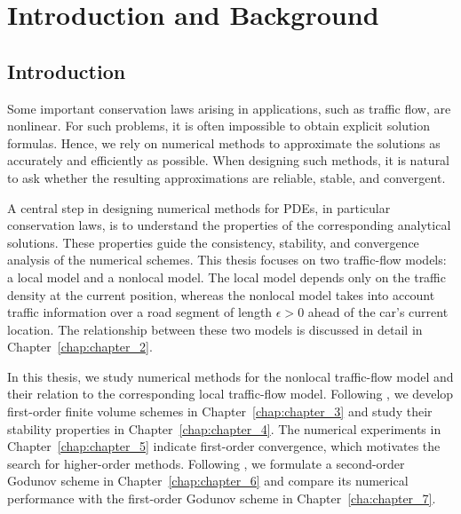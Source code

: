 \part{Introduction and Background}
\chapter{Introduction}\label{chap:chapter_1}
Some important conservation laws arising in applications, such as traffic flow, are nonlinear. For such problems, it is often impossible to obtain explicit solution formulas. Hence, we rely on numerical methods to approximate the solutions as accurately and efficiently as possible. When designing such methods, it is natural to ask whether the resulting approximations are reliable, stable, and convergent.

A central step in designing numerical methods for PDEs, in particular conservation laws, is to understand the properties of the corresponding analytical solutions. These properties guide the consistency, stability, and convergence analysis of the numerical schemes. This thesis focuses on two traffic-flow models: a local model and a nonlocal model. The local model depends only on the traffic density at the current position, whereas the nonlocal model takes into account traffic information over a road segment of length \(\epsilon>0\) ahead of the car's current location. The relationship between these two models is discussed in detail in Chapter~\ref{chap:chapter_2}.

In this thesis, we study numerical methods for the nonlocal traffic-flow model and their relation to the corresponding local traffic-flow model. Following \cite{huangAsymptoticCompatibilityClass2024}, we develop first-order finite volume schemes in Chapter~\ref{chap:chapter_3} and study their stability properties in Chapter~\ref{chap:chapter_4}. The numerical experiments in Chapter~\ref{chap:chapter_5} indicate first-order convergence, which motivates the search for higher-order methods. Following \cite{gowdag.d.ConvergenceSecondorderScheme2023}, we formulate a second-order Godunov scheme in Chapter~\ref{chap:chapter_6} and compare its numerical performance with the first-order Godunov scheme in Chapter~\ref{cha:chapter_7}.




